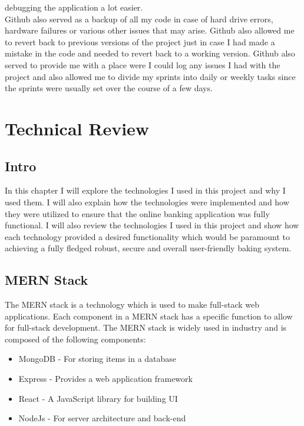  debugging the application a lot easier.
\\
  Github also served as a backup of all my code in case of hard drive errors, hardware failures or various other issues that may arise.  Github also allowed me to revert back to previous versions of the project just in case I had made a mistake in the code and needed to revert back to a working version.  Github also served to provide me with a place were I could log any issues I had with the project and also allowed me to divide my sprints into daily or weekly tasks since the sprints were usually set over the course of a few days.
\chapter{Technical Review}
\section{Intro}
In this chapter I will explore the technologies I used in this project and why I used them.  I will also explain how the technologies were implemented and how they were utilized to ensure that the online banking application was fully functional.  I will also review the technologies I used in this project and show how each technology provided a desired functionality which would be paramount to achieving a fully fledged robust, secure and overall user-friendly baking system.
\section{MERN Stack}
The MERN stack is a technology which is used to make full-stack web applications.  Each component in a MERN stack has a specific function to allow for full-stack development.  The MERN stack is widely used in industry and is composed of the following components:
 \begin{itemize}
  \item MongoDB - For storing items in a database
  \item Express - Provides a web application framework
  \item React - A JavaScript library for building UI
  \item NodeJs - For server architecture and back-end
\end{itemize}
